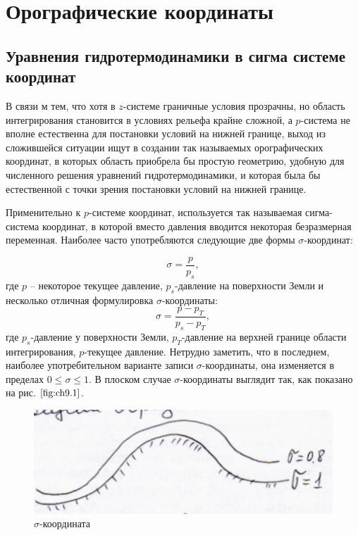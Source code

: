 \chapter{Орографические координаты}



\section{Уравнения гидротермодинамики в сигма системе координат}

В связи м тем, что хотя в $z$-системе граничные условия прозрачны, но область интегрирования становится в условиях рельефа крайне сложной, а $p$-система не вполне естественна для постановки условий на нижней границе, выход из сложившейся ситуации ищут в создании так называемых орографических координат, в которых область приобрела бы простую геометрию, удобную для численного решения уравнений гидротермодинамики, и которая была бы естественной с точки зрения постановки условий на нижней границе.

Применительно к $p$-системе координат, используется так называемая сигма-система координат, в которой вместо давления вводится некоторая безразмерная переменная. Наиболее часто употребляются следующие две формы $\sigma$-координат: 

\begin{equation}
\label{eq:sigma}
    \sigma=\frac{p}{p_s},
\end{equation}
где $p$ -- некоторое текущее давление, $p_s$-давление на поверхности Земли и несколько отличная формулировка $\sigma$-координаты:
\begin{equation}
    \sigma=\frac{p-p_T}{p_s-p_T},
\end{equation}
где $p_s$-давление у поверхности Земли, $p_T$-давление на верхней границе области интегрирования, $p$-текущее давление. Нетрудно заметить, что в последнем, наиболее употребительном варианте записи $\sigma$-координаты, она изменяется в пределах $0\leq\sigma\leq1$. В плоском случае $\sigma$-координаты выглядит так, как показано на рис. $\ref{fig:ch9.1}$.

    \begin{figure}[h]
    \centering
    \includegraphics[width=0.9\linewidth]{pics/ch9.1.png}
    \caption{\label{fig:ch9.1}
     $\sigma$-координата
    }
    \end{figure}    

